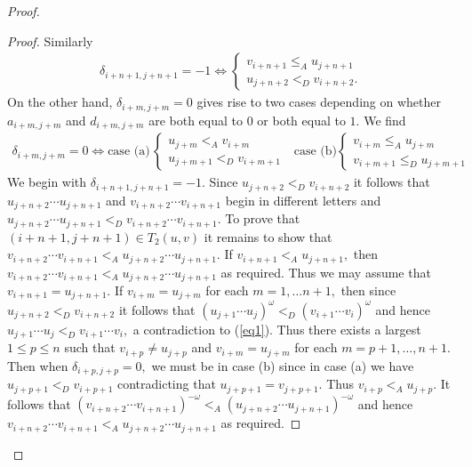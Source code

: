 \documentclass[12pt,a4paper]{amsart}
\begin{document}
\begin{proof}
\begin{proof}
Similarly 
\begin{align}\delta_{i+n+1,j+n+1}=-1\Leftrightarrow \begin{cases} v_{i+n+1}\leq_A u_{j+n+1}\\ u_{j+n+2}<_Dv_{i+n+2}.\end{cases}\end{align}
On the other hand, $\delta_{i+m,j+m}=0$ gives rise to two cases depending on whether $a_{i+m,j+m}$ and $d_{i+m,j+m}$ are both equal to $0$ or both equal to $1.$ We find
\begin{align} \delta_{i+m,j+m}=0 \Leftrightarrow \mbox{case (a)}\,\begin{cases}u_{j+m}<_A v_{i+m}\\ u_{j+m+1}<_D v_{i+m+1}\end{cases}\,\,\,\,\mbox{case (b)}\begin{cases}v_{i+m}\leq _A u_{j+m}\\ v_{i+m+1}\leq_D u_{j+m+1}\end{cases}
\end{align}
We begin with $\delta_{i+n+1,j+n+1}=-1.$ Since $u_{j+n+2}<_D v_{i+n+2}$ it follows that $u_{j+n+2}\cdots u_{j+n+1}$ and $v_{i+n+2}\cdots v_{i+n+1}$ begin in different letters and $u_{j+n+2}\cdots u_{j+n+1}<_D v_{i+n+2}\cdots v_{i+n+1}.$ 
To prove that $(i+n+1,j+n+1)\in T_2(u,v)$ it remains to show that $v_{i+n+2}\cdots v_{i+n+1} <_A u_{j+n+2}\cdots u_{j+n+1}.$
If $v_{i+n+1}<_A u_{j+n+1},$ then $v_{i+n+2}\cdots v_{i+n+1}<_A u_{j+n+2}\cdots u_{j+n+1}$ as required. Thus we may assume that
$v_{i+n+1}=u_{j+n+1}.$ If  $v_{i+m}=u_{j+m}$ for each $m=1,\ldots n+1,$  then since $u_{j+n+2}<_Dv_{i+n+2}$ it follows that $(u_{j+1}\cdots u_j)^\omega <_D (v_{i+1}\cdots v_i)^\omega$ and hence $u_{j+1}\cdots u_j <_D v_{i+1}\cdots v_i,$ a contradiction to (\ref{eq1}). 
Thus there exists a largest $1\leq p \leq n$ such that $v_{i+p}\neq  u_{j+p}$ and $v_{i+m}=u_{j+m}$ for each $m=p+1,\ldots ,n+1.$
Then when $\delta_{i+p,j+p}=0,$ we must be in case (b) since in case (a) we have $u_{j+p+1}<_D v_{i+p+1}$ contradicting that $u_{j+p+1}= v_{j+p+1}.$
Thus $ v_{i+p}<_A u_{j+p}.$   
It follows that $(v_{i+n+2}\cdots v_{i+n+1})^{-\omega} <_A (u_{j+n+2}\cdots u_{j+n+1})^{-\omega}$ and hence $v_{i+n+2}\cdots v_{i+n+1}<_A  u_{j+n+2}\cdots u_{j+n+1}$ as required.


\end{proof}
\end{proof}
\end{document}
